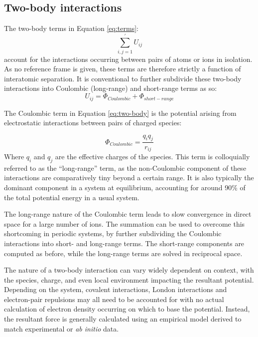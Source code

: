 \subsection{Two-body interactions}
The two-body terms in Equation \ref{eq:terms}: 
\begin{equation}
\sum_{i,j = 1}^\prime U_{ij}
\end{equation}
account for the interactions occurring between pairs of atoms or ions in isolation.
As no reference frame is given, these terms are therefore strictly a function of interatomic separation.
It is conventional to further subdivide these two-body interactions into Coulombic (long-range) and short-range terms as so:
\begin{equation}
U_{ij} = \Phi_{Coulombic} + \Phi_{short-range}
\label{eq:two-body}
\end{equation}

The Coulombic term in Equation \ref{eq:two-body} is the potential arising from electrostatic interactions between pairs of charged species:

\begin{equation}
\Phi_{Coulombic} = \frac{q_iq_j}{r_{ij}}
\label{eq:coulombic}
\end{equation}
Where $q_i$ and $q_j$ are the effective charges of the species.
This term is colloquially referred to as the ``long-range'' term, as the non-Coulombic component of these interactions are comparatively tiny beyond a certain range.
It is also typically the dominant component in a system at equilibrium, accounting for around 90\% of the total potential energy in a usual system.\cite{Catlow2013}

The long-range nature of the Coulombic term leads to slow convergence in direct space for a large number of ions.
The \citet{Ewald1921} summation can be used to overcome this shortcoming in periodic systems, by further subdividing the Coulombic interactions into short- and long-range terms.
The short-range components are computed as before, while the long-range terms are solved in reciprocal space.

The nature of a two-body interaction can vary widely dependent on context, with the species, charge, and even local environment impacting the resultant potential.
Depending on the system, covalent interactions, London interactions and electron-pair repulsions may all need to be accounted for with no actual calculation of electron density occurring on which to base the potential.
Instead, the resultant force is generally calculated using an empirical model derived to match experimental or \textit{ab initio} data.

